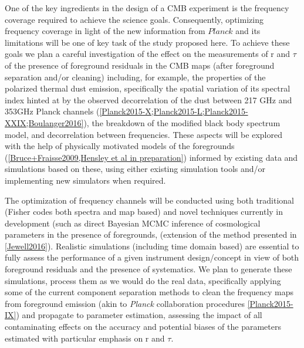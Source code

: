 One of the key ingredients in the design of a CMB experiment is the frequency coverage required to achieve the science goals. Consequently, optimizing frequency coverage in light of the new information from $Planck$ and its limitations will be one of key task of the study proposed here. To achieve these goals we plan a careful investigation of the effect on the measurements of r and $\tau$ of the presence of foreground residuals in the CMB maps (after foreground separation and/or cleaning) including, for example, the properties of the polarized thermal dust emission, specifically the spatial variation of its spectral index hinted at by the observed decorrelation of the dust between 217 GHz and 353GHz Planck channels (\ref{Planck2015-X;Planck2015-L;Planck2015-XXIX;Boulanger2016}), the breakdown of the modified black body spectrum model, and decorrelation between frequencies. 
These aspects will be explored with the help of physically motivated models of the foregrounds (\ref{Bruce+Fraisse2009,Hensley et al in preparation}) informed by existing data and simulations based on these, using either existing simulation tools and/or implementing new simulators when required. 

The optimization of frequency channels will be conducted using both traditional (Fisher codes both spectra and map based) and novel techniques currently in development (such as direct Bayesian MCMC inference of cosmological parameters in the presence of foregrounds, (extension of the method presented in  \ref{Jewell2016}). Realistic simulations (including time domain based) are essential to fully assess the performance of a given instrument design/concept in view of both foreground residuals and the presence of systematics. We plan to generate these simulations, process them as we would do the real data, specifically applying some of the current component separation methods to clean the frequency maps from foreground emission (akin to {\it Planck} collaboration procedures \ref{Planck2015-IX}) and propagate to parameter estimation, assessing the impact of all contaminating effects on the accuracy and potential biases of the parameters estimated with particular emphasis on r and $\tau$.



%





